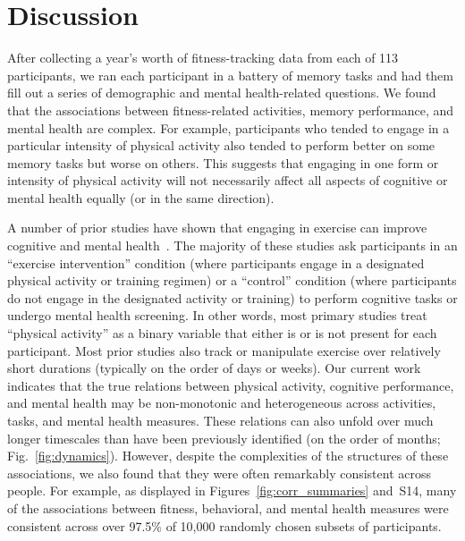 \documentclass[10pt]{article}
\newcommand{\allCorr}{S14}
\begin{document}
\section*{Discussion}
After collecting a year's worth of fitness-tracking data from each of 113
participants, we ran each participant in a battery of memory tasks and
had them fill out a series of demographic and mental health-related
questions.  We found that the associations between fitness-related
activities, memory performance, and mental health are complex.  For example,
participants who tended to engage in a particular intensity of physical activity
also tended to perform better on some memory tasks but worse on others.  This
suggests that engaging in one form or intensity of physical activity
will not necessarily affect all aspects of cognitive or mental health equally
(or in the same direction).

A number of prior studies have shown that engaging in exercise can improve cognitive
and mental health~\citep{ChanEtal12b, BrisEtal02, EtniEtal06, BassSuzu17, Ragl90, MikkEtal17, TaylEtal85, DeslEtal09, Call04,
PaluSchw00, MorrEtal18, GordEtal17, MorrEtal22, HerrEtal10}.  The majority of these studies
ask participants in an ``exercise intervention'' condition (where participants engage in
a designated physical activity or training regimen) or a ``control'' condition (where participants 
do not engage in the designated activity or training) to perform cognitive tasks or undergo
mental health screening.  In other words, most primary studies treat ``physical activity'' as a binary
variable that either is or is not present for each participant.  Most prior studies also 
track or manipulate exercise over relatively short durations (typically on the order of days or weeks).  Our current work indicates
that the true relations between physical activity, cognitive performance, and mental health
may be non-monotonic and heterogeneous across activities, tasks, and mental health measures.  These
relations can also unfold over much longer timescales than have been previously identified (on the order of months; Fig.~\ref{fig:dynamics}).
However, despite the complexities of the structures of these associations, we also found that 
they were often remarkably consistent across people.  For example, as displayed in Figures~\ref{fig:corr_summaries} and~\allCorr,
many of the associations between fitness, behavioral, and mental health
measures were consistent across over 97.5\% of 10,000 randomly chosen subsets
of participants.
\end{document}
